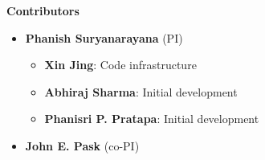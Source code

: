  \begin{frame}[allowframebreaks]{\textbf{Contributors}} \label{Contributors}

	\begin{itemize}
	\item \textbf{Phanish Suryanarayana} (PI)
	\begin{itemize}   
        \item \textbf{Xin Jing}: Code infrastructure \\  
        \item \textbf{Abhiraj Sharma}: Initial development \\ 
        \item \textbf{Phanisri P. Pratapa}: Initial development \\ 
 	\end{itemize}
   \item \textbf{John E. Pask} (co-PI)
 	\end{itemize}
  
\end{frame}


